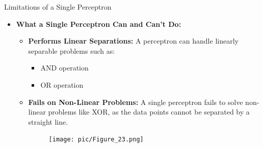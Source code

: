\documentclass[serif, aspectratio=169]{beamer}
\begin{document}
    \begin{frame}{Limitations of a Single Perceptron}
        \begin{itemize}
            \item \textbf{What a Single Perceptron Can and Can't Do:}
            \medskip
            \begin{itemize}\itemsep1em
            \item \justifying \textbf{Performs Linear Separations:}
            A perceptron can handle linearly separable problems such as:
            \begin{itemize}
                \item AND operation
                \item OR operation
            \end{itemize}
            \item \justifying \textbf{Fails on Non-Linear Problems:}
            A single perceptron fails to solve non-linear problems like XOR, as the data points cannot be separated by a straight line.
            \endminipage
            \hfill
            \begin{figure}
                \centering
                \texttt{[image: pic/Figure\_23.png]}
            \end{figure}
            \endminipage
            \end{itemize}
        \end{itemize}
    \end{frame}
\end{document}
